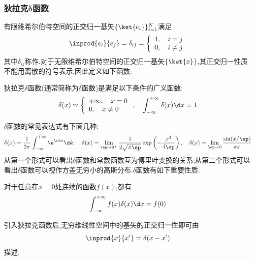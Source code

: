 \documentclass{ctexbook}
\begin{document}
\subsubsection{狄拉克$\symbf\delta$函数}
有限维希尔伯特空间的正交归一基矢$\{\ket{e_i}\}_{i=1}^{N}$满足
\[\inprod{e_i}{e_j}=\delta_{ij}=\left\{\begin{array}{l}
    1,\quad i=j\\
    0,\quad i\neq j
\end{array}\right.\]
其中$\delta_{ij}$称作.对于无限维希尔伯特空间的正交归一基矢$\left\{\ket{x}\right\}$,其正交归一性质不能用离散的符号表示,因此定义如下函数:
\begin{definition}
    狄拉克$\delta$函数(通常简称为$\delta$函数)是满足以下条件的广义函数:
    \[\delta(x)\simeq\left\{\begin{array}{l}
        +\infty,\quad x=0\\
        0,\quad x\neq 0
    \end{array}\right.,\quad\int_{-\infty}^{+\infty}\delta(x)\d x=1\]
\end{definition}
$\delta$函数的常见表达式有下面几种:
\[\delta(x)=\dfrac{1}{2\pi}\int_{-\infty}^{+\infty}\e^{\i kx}\d k,\quad\delta(x)=\lim_{\ep\to0^+}\dfrac{1}{2\sqrt{\pi\ep}}\exp\left(-\dfrac{x^2}{4\ep}\right),\quad\delta(x)=\lim_{\ep\to0}\dfrac{\sin(x/\ep)}{\pi x}\]
从第一个形式可以看出$\delta$函数和常数函数互为傅里叶变换的关系;从第二个形式可以看出$\delta$函数可以视作方差无穷小的高斯分布.$\delta$函数有如下重要性质:
\begin{theorem}
    对于任意在$x=0$处连续的函数$f(x)$,都有
    \[\int_{-\infty}^{+\infty}f(x)\delta(x)\d x=f(0)\]
\end{theorem}
\indent 引入狄拉克函数后,无穷维线性空间中的基矢的正交归一性即可由
\[\inprod{x}{x'}=\delta(x-x')\]
描述.
\end{document}
